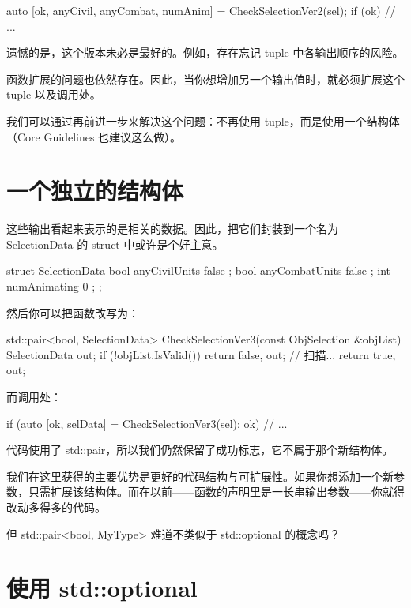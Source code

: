 \begin{codebox}[cpp]
auto [ok, anyCivil, anyCombat, numAnim] = CheckSelectionVer2(sel);
if (ok)
{
    // ...
}
\end{codebox}

遗憾的是，这个版本未必是最好的。例如，存在忘记 tuple 中各输出顺序的风险。

函数扩展的问题也依然存在。因此，当你想增加另一个输出值时，就必须扩展这个 tuple 以及调用处。

我们可以通过再前进一步来解决这个问题：不再使用 tuple，而是使用一个结构体（Core Guidelines 也建议这么做）。

\section{一个独立的结构体}

这些输出看起来表示的是相关的数据。因此，把它们封装到一个名为 SelectionData 的 struct 中或许是个好主意。

\begin{codebox}[cpp]
struct SelectionData
{
    bool anyCivilUnits { false };
    bool anyCombatUnits { false };
    int numAnimating { 0 };
};
\end{codebox}

然后你可以把函数改写为：

\begin{codebox}[cpp]
std::pair<bool, SelectionData> CheckSelectionVer3(const ObjSelection &objList)
{
    SelectionData out;
    if (!objList.IsValid())
        return {false, out};
    // 扫描...
    return {true, out};
}
\end{codebox}

而调用处：

\begin{codebox}[cpp]
if (auto [ok, selData] = CheckSelectionVer3(sel); ok)
{
    // ...
}
\end{codebox}

代码使用了 std::pair，所以我们仍然保留了成功标志，它不属于那个新结构体。

我们在这里获得的主要优势是更好的代码结构与可扩展性。如果你想添加一个新参数，只需扩展该结构体。而在以前——函数的声明里是一长串输出参数——你就得改动多得多的代码。

但 std::pair<bool, MyType> 难道不类似于 std::optional 的概念吗？

\section{使用 std::optional}

